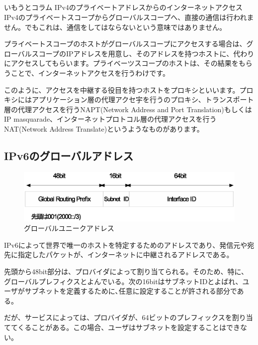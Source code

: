 \subsection*{}
\begin{itembox}[l]{いもうとコラム IPv4のプライベートアドレスからのインターネットアクセス}
IPv4のプライベートスコープからグローバルスコープへ、直接の通信は行われません。でもこれは、通信をしてはならないという意味ではありません。

プライベートスコープのホストがグローバルスコープにアクセスする場合は、グローバルスコープのIPアドレスを用意し、そのアドレスを持つホストに、代わりにアクセスしてもらいます。プライベーツスコープのホストは、その結果をもらうことで、インターネットアクセスを行うわけです。

このように、アクセスを中継する役目を持つホストをプロキシといいます。プロキシにはアプリケーション層の代理アクセ宇を行うのプロキシ、トランスポート層の代理アクセスを行うNAPT(Network Address and Port Translation)もしくはIP masquarade、インターネットプロトコル層の代理アクセスを行うNAT(Network Address Translate)というようなものがあります。

\end{itembox}

\subsection{IPv6のグローバルアドレス}

\begin{figure}[htbp]
	\includegraphics[width=12cm,clip]{draw/gua.eps}
	\caption{グローバルユニークアドレス}
	\label{fig:gua}
\end{figure}


IPv6によって世界で唯一のホストを特定するためのアドレスであり、発信元や宛先に指定したパケットが、インターネットに中継されるアドレスである。

先頭から48bit部分は、プロバイダによって割り当てられる。そのため、特に、グローバルプレフィクスとよんでいる。次の16bitはサブネットIDとよばれ、ユーザがサブネットを定義するために､任意に設定することが許される部分である。

だが、サービスによっては、プロバイダが、64ビットのプレフィックスを割り当ててくることがある。この場合、ユーザはサブネットを設定することはできない。

